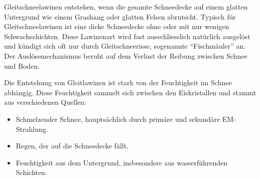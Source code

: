 


Gleitschneelawinen entstehen, wenn die gesamte Schneedecke auf einem glatten Untergrund wie einem Grashang oder glatten Felsen abrutscht. Typisch für Gleitschneelawinen ist eine dicke Schneedecke ohne oder mit nur wenigen Schwachschichten. Diese Lawinenart wird fast ausschliesslich natürlich ausgelöst und kündigt sich oft nur durch Gleitschneerisse, sogenannte “Fischmäuler” an. Der Auslösemechanismus beruht auf dem Verlust der Reibung zwischen Schnee und Boden.

Die Entstehung von Gleitlawinen ist stark von der Feuchtigkeit im Schnee abhängig. Diese Feuchtigkeit sammelt sich zwischen den Eiskristallen und stammt aus verschiedenen Quellen:

\begin{itemize}
    \item Schmelzender Schnee, hauptsächlich durch primäre und sekundäre EM-Strahlung.
    \item Regen, der auf die Schneedecke fällt.
    \item Feuchtigkeit aus dem Untergrund, insbesondere aus wasserführenden Schichten.
\end{itemize}
